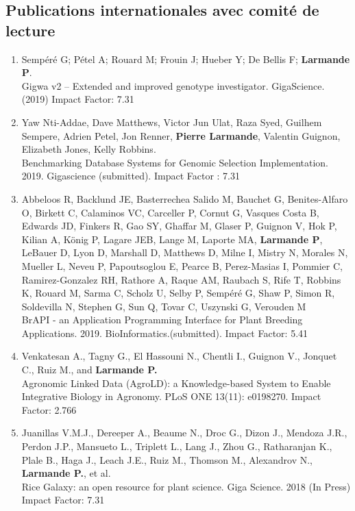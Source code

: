 \subsection*{Publications internationales avec comité de lecture} 

\begin{enumerate}
\item Sempéré G; Pétel A; Rouard M; Frouin J; Hueber Y; De Bellis F; \textbf{Larmande P}.\\ Gigwa v2 – Extended and improved genotype investigator. GigaScience. (2019) Impact Factor: 7.31
\item Yaw Nti-Addae, Dave Matthews, Victor Jun Ulat, Raza Syed, Guilhem Sempere, Adrien Petel, Jon Renner, \textbf{Pierre Larmande}, Valentin Guignon, Elizabeth Jones, Kelly Robbins.\\ Benchmarking Database Systems for Genomic Selection Implementation. 2019. Gigascience (submitted). Impact Factor : 7.31
\item Abbeloos R, Backlund JE, Basterrechea Salido M, Bauchet G, Benites-Alfaro O, Birkett C, Calaminos VC, Carceller P, Cornut G, Vasques Costa B, Edwards JD, Finkers R, Gao SY, Ghaffar M, Glaser P, Guignon V, Hok P, Kilian A, König P, Lagare JEB, Lange M, Laporte MA, \textbf{Larmande P}, LeBauer D, Lyon D, Marshall D, Matthews D, Milne I, Mistry N, Morales N, Mueller L, Neveu P, Papoutsoglou E, Pearce B, Perez-Masias I, Pommier C, Ramirez-Gonzalez RH, Rathore A, Raque AM, Raubach S, Rife T, Robbins K, Rouard M, Sarma C, Scholz U, Selby P, Sempéré G, Shaw P, Simon R, Soldevilla N, Stephen G, Sun Q, Tovar C, Uszynski G, Verouden M\\ BrAPI - an Application Programming Interface for Plant Breeding Applications. 2019. BioInformatics.(submitted). Impact Factor: 5.41
\item  Venkatesan A., Tagny G., El Hassouni N., Chentli I., Guignon V., Jonquet C., Ruiz M., and \textbf{Larmande P.}\\ Agronomic Linked Data (AgroLD): a Knowledge-based System to Enable Integrative Biology in Agronomy. PLoS ONE 13(11): e0198270.  Impact Factor: 2.766
\item Juanillas V.M.J., Dereeper A., Beaume N., Droc G., Dizon J., Mendoza J.R., Perdon J.P., Mansueto L., Triplett L., Lang J., Zhou G., Ratharanjan K., Plale B., Haga J., Leach J.E., Ruiz M., Thomson M., Alexandrov N., \textbf{Larmande P.}, et al.\\ Rice Galaxy: an open resource for plant science. Giga Science. 2018 (In Press) Impact Factor: 7.31

\end{enumerate}
